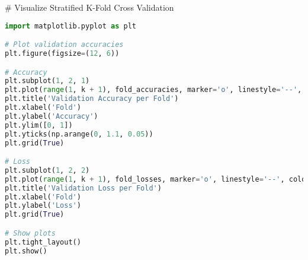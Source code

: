 # Visualize Stratified K-Fold Cross Validation
\begin{lstlisting}[language=Python]
import matplotlib.pyplot as plt

# Plot validation accuracies
plt.figure(figsize=(12, 6))

# Accuracy
plt.subplot(1, 2, 1)
plt.plot(range(1, k + 1), fold_accuracies, marker='o', linestyle='--', color='b')
plt.title('Validation Accuracy per Fold')
plt.xlabel('Fold')
plt.ylabel('Accuracy')
plt.ylim([0, 1])
plt.yticks(np.arange(0, 1.1, 0.05))
plt.grid(True)

# Loss
plt.subplot(1, 2, 2)
plt.plot(range(1, k + 1), fold_losses, marker='o', linestyle='--', color='r')
plt.title('Validation Loss per Fold')
plt.xlabel('Fold')
plt.ylabel('Loss')
plt.grid(True)

# Show plots
plt.tight_layout()
plt.show()
\end{lstlisting}

























